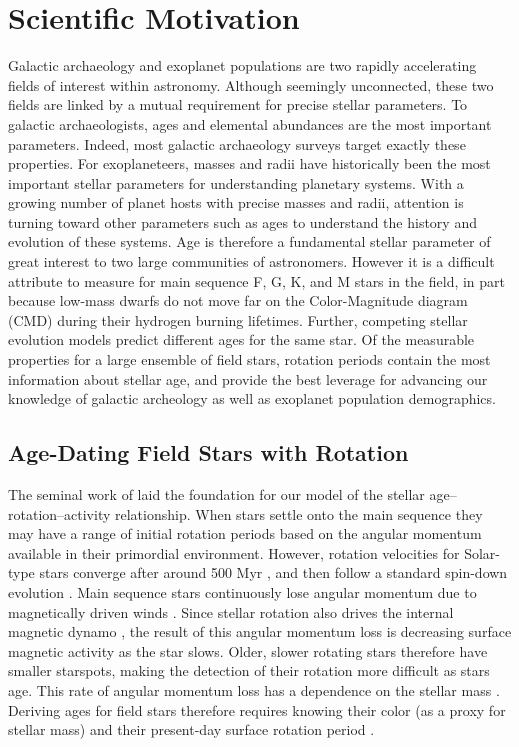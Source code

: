 \documentclass[12pt]{article}
\begin{document}
\section{Scientific Motivation}
Galactic archaeology and exoplanet populations are two rapidly accelerating
fields of interest within astronomy.
Although seemingly unconnected, these two fields are linked by a mutual
requirement for precise stellar parameters.
To galactic archaeologists, ages and elemental abundances are the most
important parameters.
Indeed, most galactic archaeology surveys target exactly these properties.
For exoplaneteers, masses and radii have historically been the most important
stellar parameters for understanding planetary systems.
With a growing number of planet hosts with precise masses and radii, attention
is turning toward other parameters such as ages to understand the history and
evolution of these systems.
Age is therefore a fundamental stellar parameter of great interest to two
large communities of astronomers.
However it is a difficult attribute to measure for main sequence F, G, K, and
M stars in the field, in part because low-mass dwarfs do not move far on the
Color-Magnitude diagram (CMD) during their hydrogen burning lifetimes.
Further, competing stellar evolution models predict different ages for the
same star.
Of the measurable properties for a large ensemble of field stars, rotation
periods contain the most information about stellar age, and provide the best
leverage for advancing our knowledge of galactic archeology as well as
exoplanet population demographics.


\subsection{Age-Dating Field Stars with Rotation}
The seminal work of \citet{skumanich1972} laid the foundation for our model of
the stellar age--rotation--activity relationship.
When stars settle onto the main sequence they may have a range of initial
rotation periods based on the angular momentum available in their primordial
environment.
However, rotation velocities for Solar-type stars converge after around 500 Myr \citep{radick1987,irwin2009b}, and then follow a standard spin-down
evolution \citep{barnes2010}.
Main sequence stars continuously lose angular momentum due to
magnetically driven winds \citep{schatzman1962, weber1967, mestel1984,
kawaler1988, charbonneau2010}.
Since stellar rotation also drives the internal magnetic dynamo
\citep[][]{schatzman1962, parker1970}, the result of this angular momentum
loss is decreasing surface magnetic activity as the star slows.
Older, slower rotating stars therefore have smaller starspots, making the
detection of their rotation more difficult as stars age.
This rate of angular momentum loss has a dependence on the stellar mass
\citep{noyes1984}.
Deriving ages for field stars therefore requires knowing their color (as a
proxy for stellar mass) and their present-day surface rotation period
\citep{barnes2007}.
\end{document}
